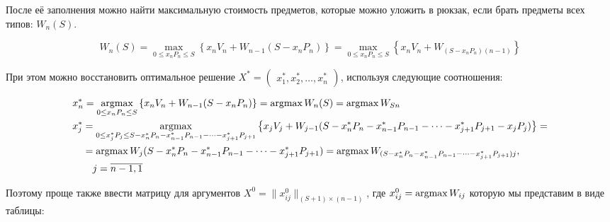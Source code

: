После её заполнения можно найти максимальную стоимость предметов, которые можно уложить в рюкзак, если брать предметы всех типов: $W_n(S)$.

\[ W_n(S) = \max\limits_{0 \leq x_nP_n \leq S} \left\{x_nV_n + W_{n-1}(S - x_nP_n)\right\} = \max\limits_{0 \leq x_nP_n \leq S} \left\{x_nV_n + W_{(S - x_nP_n)(n-1)}\right\} \]

При этом можно восстановить оптимальное решение $X^* = \begin{pmatrix} x_1^*, x_2^*, \dots, x_n^* \end{pmatrix}$, используя следующие соотношения:

\begin{align*}
     & x_n^* = \operatorname*{argmax}\limits_{0 \leq x_nP_n \leq S} \left\{x_nV_n + W_{n-1}(S - x_nP_n)\right\} = \operatorname*{argmax} W_n(S) = \operatorname*{argmax} W_{Sn}                                                                                        \\
     & \begin{aligned}
           x_j^* & = \operatorname*{argmax}\limits_{0 \leq x_j^* P_j \leq S - x_n^*P_n - x_{n-1}^*P_{n-1} - \dots - x_{j+1}^*P_{j+1}} \left\{x_jV_j + W_{j-1}(S - x_n^*P_n - x_{n-1}^*P_{n-1} - \dots - x_{j+1}^*P_{j+1} - x_jP_j)\right\} = \\
                 & = \operatorname*{argmax} W_j(S - x_n^*P_n - x_{n-1}^*P_{n-1} - \dots - x_{j+1}^*P_{j+1}) = \operatorname*{argmax} W_{(S - x_n^*P_n - x_{n-1}^*P_{n-1} - \dots - x_{j+1}^*P_{j+1})j},                                                     \\
                 & \quad j = \overline{n-1, 1}
       \end{aligned}
\end{align*}

Поэтому проще также ввести матрицу для аргументов $X^0 = \| x_{ij}^0 \|_{(S+1) \times (n-1)}$, где $x_{ij}^0 = \operatorname*{argmax} W_{ij}$ которую мы представим в виде таблицы:

